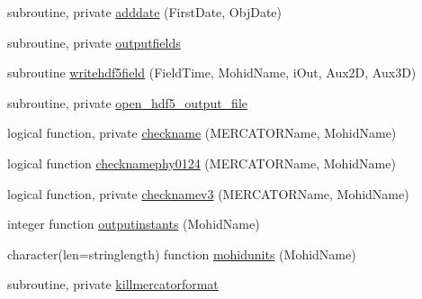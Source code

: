 \begin{DoxyCompactItemize}
\item 
subroutine, private \mbox{\hyperlink{namespacemodulemercatorformat_af022169c1f02b5fca22275beb30ca516}{adddate}} (First\+Date, Obj\+Date)
\item 
subroutine, private \mbox{\hyperlink{namespacemodulemercatorformat_a9ef4ded8a79fc7dae92a2f3410aa9ab4}{outputfields}}
\item 
subroutine \mbox{\hyperlink{namespacemodulemercatorformat_a0b4f8793ec9ff2e27a2372febde0eac4}{writehdf5field}} (Field\+Time, Mohid\+Name, i\+Out, Aux2D, Aux3D)
\item 
subroutine, private \mbox{\hyperlink{namespacemodulemercatorformat_a856b781d5405606ffbd1e7409a516633}{open\+\_\+hdf5\+\_\+output\+\_\+file}}
\item 
logical function, private \mbox{\hyperlink{namespacemodulemercatorformat_a824858a27df60fc6f255443ee4ca7a96}{checkname}} (M\+E\+R\+C\+A\+T\+O\+R\+Name, Mohid\+Name)
\item 
logical function \mbox{\hyperlink{namespacemodulemercatorformat_a56d6a124d89d9acc9f4d378fbf3fc84f}{checknamephy0124}} (M\+E\+R\+C\+A\+T\+O\+R\+Name, Mohid\+Name)
\item 
logical function, private \mbox{\hyperlink{namespacemodulemercatorformat_aa50cf57bf22a01dde1d85b4dd1d6baa0}{checknamev3}} (M\+E\+R\+C\+A\+T\+O\+R\+Name, Mohid\+Name)
\item 
integer function \mbox{\hyperlink{namespacemodulemercatorformat_ab6a85f957c668b2ecb52cea10902d0e7}{outputinstants}} (Mohid\+Name)
\item 
character(len=stringlength) function \mbox{\hyperlink{namespacemodulemercatorformat_afcc318c8448502d22aecff9e1bf75f91}{mohidunits}} (Mohid\+Name)
\item 
subroutine, private \mbox{\hyperlink{namespacemodulemercatorformat_a33fe8f1a366fc933cb9debc1dcc3debe}{killmercatorformat}}
\end{DoxyCompactItemize}
